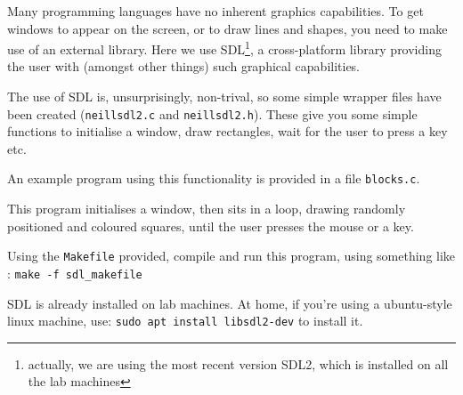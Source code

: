 
Many programming languages have no inherent graphics capabilities.
To get windows to appear on the screen, or to draw lines and shapes,
you need to make use of an external library. Here we use SDL\footnote{
actually, we are using the most recent version SDL2, which is installed
on all the lab machines}, a cross-platform library providing the user with
(amongst other things) such graphical capabilities.


The use of SDL is, unsurprisingly, non-trival, so some simple wrapper
files have been created (\verb^neillsdl2.c^ and \verb^neillsdl2.h^).
These give you some simple functions to initialise a window, draw
rectangles, wait for the user to press a key etc.

An example program using this functionality is
provided in a file \verb^blocks.c^.

This program initialises a window, then sits in a loop, drawing
randomly positioned and coloured squares, until the
user presses the mouse or a key. 

\begin{exercise}
Using the \verb^Makefile^ provided, compile and run this program,
using something like : \verb^make -f sdl_makefile^

SDL is already installed on lab machines. At home, if you're using a
ubuntu-style linux machine, use: \verb^sudo apt install libsdl2-dev^
to install it.
\end{exercise}
